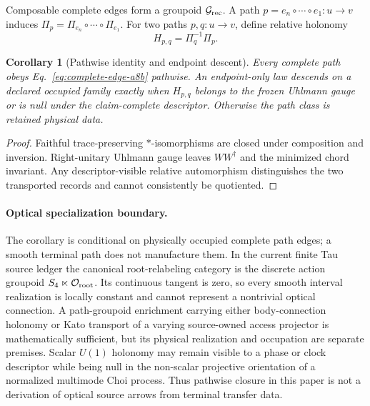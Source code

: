 \documentclass[11pt]{article}
\newtheorem{corollary}{Corollary}
\begin{document}
Composable complete edges form a groupoid \(\mathcal G_{\rm rec}\).  A path
\(p=e_n\circ\cdots\circ e_1:u\to v\) induces
\(\Pi_p=\Pi_{e_n}\circ\cdots\circ\Pi_{e_1}\).  For two paths \(p,q:u\to v\),
define relative holonomy
\begin{equation}
 H_{p,q}=\Pi_q^{-1}\Pi_p.
 \label{eq:relative-holonomy}
\end{equation}

\begin{corollary}[Pathwise identity and endpoint descent]
Every complete path obeys Eq.~\eqref{eq:complete-edge-a8b} pathwise.  An
endpoint-only law descends on a declared occupied family exactly when
\(H_{p,q}\) belongs to the frozen Uhlmann gauge or is null under the
claim-complete descriptor.  Otherwise the path class is retained physical
data.
\end{corollary}
\begin{proof}
Faithful trace-preserving \(*\)-isomorphisms are closed under composition and
inversion.  Right-unitary Uhlmann gauge leaves \(WW^\dagger\) and the minimized
chord invariant.  Any descriptor-visible relative automorphism distinguishes
the two transported records and cannot consistently be quotiented.
\end{proof}

\paragraph{Optical specialization boundary.}
The corollary is conditional on physically occupied complete path edges; a
smooth terminal path does not manufacture them.  In the current finite Tau
source ledger the canonical root-relabeling category is the discrete action
groupoid \(S_4\ltimes\mathcal O_{\rm root}\).  Its continuous tangent is zero,
so every smooth interval realization is locally constant and cannot represent
a nontrivial optical connection.  A path-groupoid enrichment carrying either
body-connection holonomy or Kato transport of a varying source-owned access
projector is mathematically sufficient, but its physical realization and
occupation are separate premises.  Scalar \(U(1)\) holonomy may remain visible
to a phase or clock descriptor while being null in the non-scalar projective
orientation of a normalized multimode Choi process.  Thus pathwise closure in
this paper is not a derivation of optical source arrows from terminal transfer
data.
\end{document}
